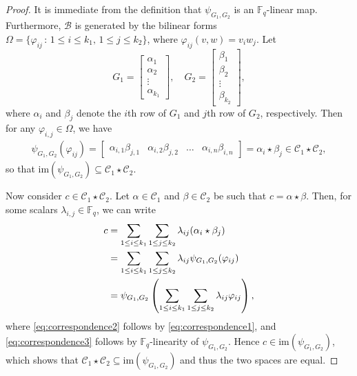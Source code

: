 \documentclass[a4paper,11pt,reqno]{article}
\newcommand{\F}{\mathbb{F}}
\newcommand{\C}{\mathcal{C}}
\newcommand{\im}{\mathrm{im}}
\theoremstyle{plain} \numberwithin{equation}{section}
\theoremstyle{definition}
\begin{document}
\begin{proof}
It is immediate from the definition that $\psi_{G_1,G_2}$ is an $\F_q$-linear map. Furthermore, $\mathcal{B}$ is generated by the bilinear forms $\Omega=\{\varphi_{ij} \, : \,  1 \leq i \leq  k_1, \, 1 \leq j \leq k_2\}$, where $\varphi_{ij}(v,w) = v_iw_j$. Let
\[
    G_1 = \begin{bmatrix} \alpha_1 \\ \alpha_2 \\ \vdots \\ \alpha_{k_1} \end{bmatrix},\quad G_2 = \begin{bmatrix} \beta_1 \\ \beta_2 \\\vdots \\ \beta_{k_2} \end{bmatrix},
\]
where $\alpha_i$ and $\beta_j$ denote the $i$th row of $G_1$ and $j$th row of $G_2$, respectively. Then for any $\varphi_{i,j}\in \Omega$, we have
\begin{align}
\psi_{G_1, G_2}(\varphi_{ij}) = \begin{bmatrix}
       \alpha_{i,1} \beta_{j,1} &  \alpha_{i,2}\beta_{j,2} & \ldots &  \alpha_{i,n}\beta_{i,n}
   \end{bmatrix} = \alpha_i \star \beta_j \in \C_1 \star \C_2, \label{eq:correspondence1}
\end{align}
so that $\im(\psi_{G_1,G_2}) \subseteq \C_1 \star \C_2$.

Now consider $c\in \C_1 \star \C_2$. Let $\alpha\in \C_1$ and $\beta\in \C_2$ be such that $c=\alpha \star \beta$. Then, for some scalars $\lambda_{i,j}\in \F_q$, we can write
\begin{align}
    c &= \sum_{1 \leq i \leq k_1} \sum_{1 \leq j \leq k_2} \lambda_{ij} (\alpha_i \star \beta_j ) \notag \\
                &= \sum_{1 \leq i \leq k_1} \sum_{1 \leq j \leq k_2} \lambda_{ij} \psi_{G_1,G_2}(\varphi_{ij}) \label{eq:correspondence2}\\
                &= \psi_{G_1,G_2}\left(\sum_{1 \leq i \leq k_1} \sum_{1 \leq j \leq k_2} \lambda_{ij} \varphi_{ij}\right),\label{eq:correspondence3}
\end{align}
where \eqref{eq:correspondence2} follows by \eqref{eq:correspondence1}, and \eqref{eq:correspondence3} follows by $\F_q$-linearity of $\psi_{G_1, G_2}$.
Hence $c \in \im(\psi_{G_1, G_2})$, which shows that $\C_1 \star \C_2 \subseteq \im(\psi_{G_1, G_2})$ and thus the two spaces are equal.
\end{proof}
\end{document}
